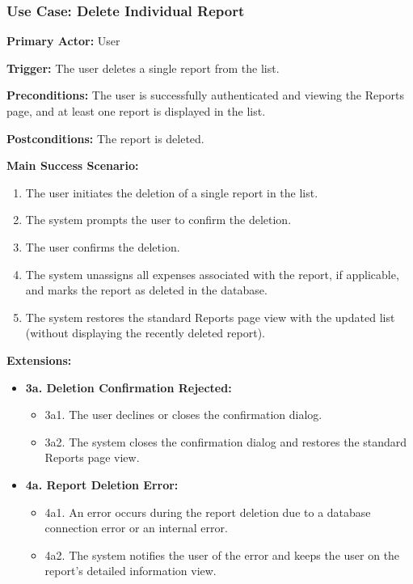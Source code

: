 \subsubsection{\textbf{Use Case: Delete Individual Report}}

\textbf{Primary Actor:} User

\textbf{Trigger:} The user deletes a single report from the list.

\textbf{Preconditions:} The user is successfully authenticated and viewing the Reports page, and at least one report is displayed in the list.

\textbf{Postconditions:} The report is deleted.

\vspace{0.5cm}

\textbf{Main Success Scenario:}

\begin{enumerate} [leftmargin=0.75cm, noitemsep]
\item The user initiates the deletion of a single report in the list.
\item The system prompts the user to confirm the deletion.
\item The user confirms the deletion.
\item The system unassigns all expenses associated with the report, if applicable, and marks the report as deleted in the database.
\item The system restores the standard Reports page view with the updated list (without displaying the recently deleted report).
\end{enumerate}

\vspace{0.3cm}

\textbf{Extensions:}

\begin{itemize} [label={}, leftmargin=0.75cm, noitemsep]

\item \textbf{3a. Deletion Confirmation Rejected:}
\begin{itemize} [label={}, leftmargin=0.75cm, noitemsep]
    \item 3a1. The user declines or closes the confirmation dialog.
    \item 3a2. The system closes the confirmation dialog and restores the standard Reports page view.
\end{itemize}

\item \textbf{4a. Report Deletion Error:}
\begin{itemize} [label={}, leftmargin=0.75cm, noitemsep]
    \item 4a1. An error occurs during the report deletion due to a database connection error or an internal error.
    \item 4a2. The system notifies the user of the error and keeps the user on the report’s detailed information view.
\end{itemize}

\end{itemize}

\vspace{0.3cm}
